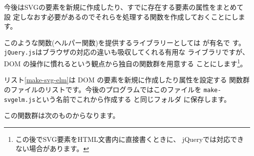 今後はSVGの要素を新規に作成したり、すでに存在する要素の属性をまとめて設
定しなおす必要があるのでそれらを処理する関数を作成しておくことにします。

このような関数(ヘルパー関数)を提供するライブラリーとしては
が有名で
す。\texttt{jQuery.js}はブラウザの対応の違いも吸収してくれる有用な
ライブラリですが、DOM の操作に慣れるという観点から独自の関数群を用意する
ことにします\footnote{この後でSVG要素をHTML文書内に直接書くときに、
jQueryでは対応できない場合があります。}。

リスト\ref{make-svg-elm}は DOM の要素を新規に作成したり属性を設定する
関数群のファイルのリストです。今後のプログラムではこのファイルを
\texttt{make-svgelm.js}という名前でこれから作成する \SVG と同じフォルダ
に保存します。

この関数群は次のものからなります。


